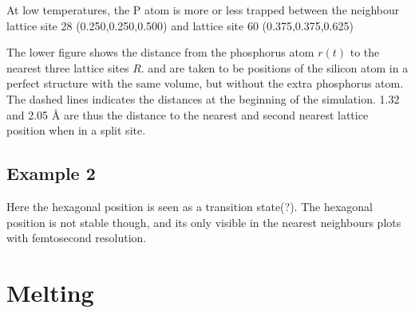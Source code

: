 \documentclass[11pt,bibliography=totoc,index=totoc]{scrbook}   %
\begin{document}
At low temperatures, the P atom is more or less trapped between the neighbour lattice site 28 (0.250,0.250,0.500) and lattice site 60 (0.375,0.375,0.625)

  The lower figure shows the distance from the phosphorus atom $r(t)$ to the nearest three lattice sites $R$.
  and are taken to be positions of the silicon atom in a perfect structure with the same volume, but without the extra phosphorus atom.
  The dashed lines indicates the distances at the beginning of the simulation. 1.32 and 2.05 Å are thus the distance to the nearest
  and second nearest lattice position when in a split site.







%
\subsection{Example 2}
%

Here the hexagonal position is seen as a transition state(?). 
The hexagonal position is not stable though, and its only visible in the nearest neighbours plots
with femtosecond resolution.


%
\section{Melting}
%

\end{document}
